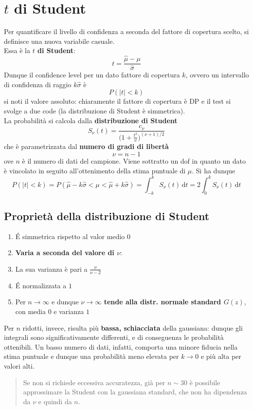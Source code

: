 \documentclass[10pt, oneside]{book}
\newcommand{\integral}[4]{\int_{#1}^{#2} #3 \, \mathrm{d}#4}
\begin{document}
\section{$t$ di Student}
Per quantificare il livello di confidenza a seconda del fattore di copertura scelto, si definisce una nuova variabile casuale.\\
Essa è la \textbf{$t$ di Student}:
\[t = \frac{\hat{\mu} - \mu}{\hat{\sigma}}\]
Dunque il confidence level per un dato fattore di copertura $k$, ovvero un intervallo di confidenza di raggio $k \hat{\sigma}$ è
\[P(|t| < k)\]
si noti il valore assoluto: chiaramente il fattore di copertura è DP e il test si svolge a due code (la distribuzione di Student è simmetrica).\\
La probabilità si calcola dalla \textbf{distribuzione di Student}
\[S_\nu (t) = \frac{c_\nu}{\displaystyle \bigg(1 + \frac{t^2}{\nu}\bigg)^{(\nu+1)/2}}\]
che è parametrizzata dal \textbf{numero di gradi di libertà}
\[\nu = n - 1\]
ove $n$ è il numero di dati del campione. Viene sottratto un dof in quanto un dato è vincolato in seguito all'ottenimento della stima puntuale di $\mu$. Si ha dunque
\[P(|t| < k) = P(\hat{\mu} - k \hat{\sigma} < \mu < \hat{\mu} + k \hat{\sigma}) = \integral{-k}{k}{S_\nu(t)}{t} = 2 \integral{0}{k}{S_\nu(t)}{t}\]
\subsection{Proprietà della distribuzione di Student}
\begin{enumerate}
\item \'E simmetrica rispetto al valor medio $0$
\item \textbf{Varia a seconda del valore di $\nu$}:
\item La sua varianza è pari a $\displaystyle \frac{\nu}{\nu - 2}$
\item \'E normalizzata a $1$
\item Per $n \rightarrow \infty$ e dunque $\nu \rightarrow \infty$ \textbf{tende alla distr. normale standard $G(z)$}, con media $0$ e varianza $1$
\end{enumerate}
Per $n$ ridotti, invece, risulta più \textbf{bassa, schiacciata} della gaussiana: dunque gli integrali sono significativamente differenti, e di conseguenza le probabilità ottenibili. Un basso numero di dati, infatti, comporta una minore fiducia nella stima puntuale e dunque una probabilità meno elevata per $k \rightarrow 0$ e più alta per valori alti.
\begin{quote}
Se non si richiede eccessiva accuratezza, già per $n \sim 30$ è possibile approssimare la Student con la gaussiana standard, che non ha dipendenza da $\nu$ e quindi da $n$.
\end{quote}
\end{document}
